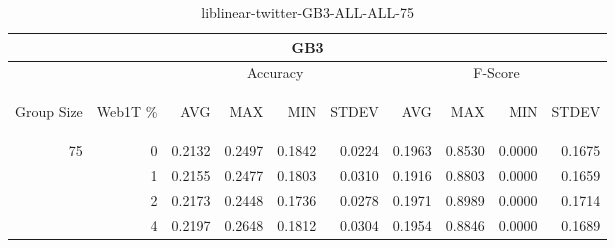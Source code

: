 \begin{center}
\begin{table}[htbp]
\begin{tabular}{ | r | r | r | r | r | r | r | r | r | r |}
\hline
\multicolumn{10}{|c|}{GB3}\\
\hline
 & & \multicolumn{4}{|c|}{Accuracy} & \multicolumn{4}{|c|}{F-Score}\\ \cline{3-10}
\begin{sideways}Group Size\end{sideways} & \begin{sideways}Web1T \%\end{sideways} & \begin{sideways}AVG\end{sideways} & \begin{sideways}MAX\end{sideways} & \begin{sideways}MIN\end{sideways} & \begin{sideways}STDEV\end{sideways} & \begin{sideways}AVG\end{sideways} & \begin{sideways}MAX\end{sideways} & \begin{sideways}MIN\end{sideways} & \begin{sideways}STDEV\end{sideways}\\
\hline
\multirow{4}{*}{75}
 & 0 & 0.2132 & 0.2497 & 0.1842 & 0.0224 & 0.1963 & 0.8530 & 0.0000 & 0.1675\\ \cline{2-10}
 & 1 & 0.2155 & 0.2477 & 0.1803 & 0.0310 & 0.1916 & 0.8803 & 0.0000 & 0.1659\\ \cline{2-10}
 & 2 & 0.2173 & 0.2448 & 0.1736 & 0.0278 & 0.1971 & 0.8989 & 0.0000 & 0.1714\\ \cline{2-10}
 & 4 & 0.2197 & 0.2648 & 0.1812 & 0.0304 & 0.1954 & 0.8846 & 0.0000 & 0.1689\\ \cline{2-10}
\hline
\end{tabular}
\caption{liblinear-twitter-GB3-ALL-ALL-75}
\end{table}
\end{center}

